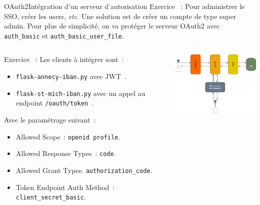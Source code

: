\documentclass{beamer}
\begin{document}
    \begin{frame}{OAuth2}{Intégration d'un serveur d'autorisation}
        Exercice \execcounterdispinc{}~:
        Pour administrer le SSO, créer les users, \textit{etc}.
        Une solution est de créer un compte de type super admin.
        Pour plus de simplicité, on va protéger le serveur OAuth2 avec \lstinline{auth_basic} et \lstinline{auth_basic_user_file}.
        \begin{columns}
            \begin{column}{0.6\textwidth}
                Exercice \execcounterdispinc{}~:
                Les clients à intégrer sont~:
                \begin{itemize}
                    \item \lstinline{flask-annecy-iban.py} avec JWT~.
                    \item \lstinline{flask-st-mich-iban.py} avec un appel au endpoint \lstinline{/oauth/token}~.
                \end{itemize}
                Avec le paramétrage suivant~:
                \begin{itemize}
                    \item Allowed Scope~: \lstinline{openid profile}.
                    \item Allowed Response Types~: \lstinline{code}.
                    \item Allowed Grant Types: \lstinline{authorization_code}.
                    \item Token Endpoint Auth Method~: \lstinline{client_secret_basic}.
                \end{itemize}
            \end{column}
            \begin{column}{0.4\textwidth}
                \centering
                \includegraphics[width=6cm]{image/OAuth2-integration.drawio}
            \end{column}
        \end{columns}
    \end{frame}
\end{document}
